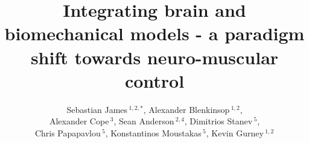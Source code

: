 \documentclass{frontiersSCNS}
\def\firstAuthorLast{James {et~al.}}
\def\Authors{Sebastian James\,$^{1,2,*}$, Alexander Blenkinsop\,$^{1,2}$, \\
  Alexander Cope\,$^3$, Sean Anderson\,$^{2,4}$, Dimitrios Stanev\,$^5$, \\
  Chris Papapavlou\,$^5$, Konstantinos Moustakas\,$^5$, Kevin Gurney\,$^{1,2}$}
\begin{document}


\onecolumn
{}

\title[Integrated brain and biomechanics]{
  Integrating brain and biomechanical models - a paradigm shift
  towards neuro-muscular control
}

\author[\firstAuthorLast ]{\Authors}
\address{}
\correspondance{}
\extraAuth{} %

\maketitle

\end{document}
